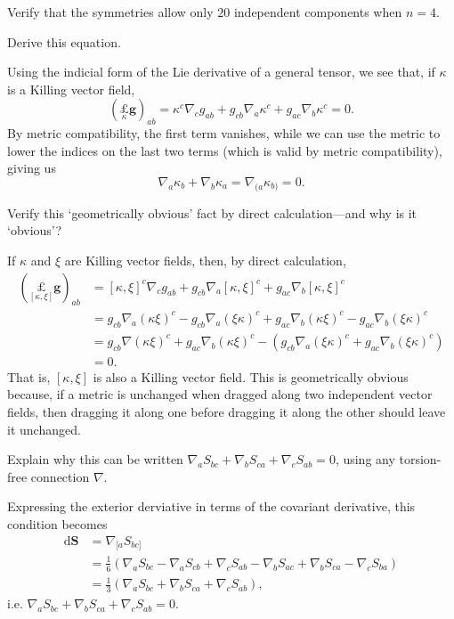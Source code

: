 \documentclass[../the-road-to-reality.tex]{subfiles}
\begin{document}
\begin{questions}
\question Verify that the symmetries allow only $20$ independent components when
  $n = 4$.

\question Derive this equation.

  \begin{solution}
    Using the indicial form of the Lie derivative of a general tensor, we see
    that, if $\kappa$ is a Killing vector field,
    \[
      (\underset{\kappa}{\pounds}\mathbf{g})_{ab} = \kappa^c\nabla_cg_{ab} +
      g_{cb}\nabla_a\kappa^c + g_{ac}\nabla_b\kappa^c = 0.
    \]
    By metric compatibility, the first term vanishes, while we can use the
    metric to lower the indices on the last two terms (which is valid by metric
    compatibility), giving us
    \[
      \nabla_a\kappa_b + \nabla_b\kappa_a = \nabla_{(a}\kappa_{b)}=0.
    \]
  \end{solution}

\question Verify this `geometrically obvious' fact by direct calculation---and
  why is it `obvious'?

  \begin{solution}
    If $\kappa$ and $\xi$ are Killing vector fields, then, by direct calculation,
    \begin{align*}
      (\underset{[\kappa,\xi]}{\pounds}\mathbf{g})_{ab} &= [\kappa,\xi]^c\nabla_cg_{ab} + g_{cb}\nabla_a[\kappa,\xi]^c + g_{ac}\nabla_b[\kappa,\xi]^c \\
                                                        &= g_{cb}\nabla_a(\kappa\xi)^c - g_{cb}\nabla_a(\xi\kappa)^c + g_{ac}\nabla_b(\kappa\xi)^c - g_{ac}\nabla_b(\xi\kappa)^c \\
                                                        &= g_{cb}\nabla(\kappa\xi)^c + g_{ac}\nabla_b(\kappa\xi)^c - (g_{cb}\nabla_a(\xi\kappa)^c + g_{ac}\nabla_b(\xi\kappa)^c) \\
      &= 0.
    \end{align*}
    That is, $[\kappa,\xi]$ is also a Killing vector field. This is
    geometrically obvious because, if a metric is unchanged when dragged along
    two independent vector fields, then dragging it along one before dragging it
    along the other should leave it unchanged. 
  \end{solution}

\question Explain why this can be written $\nabla_aS_{bc} + \nabla_bS_{ca} +
  \nabla_cS_{ab} = 0$, using any torsion-free connection $\nabla$.

  \begin{solution}
    Expressing the exterior derviative in terms of the covariant derivative,
    this condition becomes
    \begin{align*}
      \mathrm{d}\mathbf{S} &= \nabla_{[a}S_{bc]} \\
                           &= \frac{1}{6}(\nabla_aS_{bc} - \nabla_aS_{cb} + \nabla_cS_{ab} - \nabla_bS_{ac} + \nabla_bS_{ca} - \nabla_cS_{ba}) \\
      &= \frac{1}{3}(\nabla_aS_{bc} + \nabla_bS_{ca} + \nabla_cS_{ab}),
    \end{align*}
    i.e. $\nabla_aS_{bc} + \nabla_bS_{ca} + \nabla_cS_{ab} = 0$.
  \end{solution}


\end{questions}
\end{document}
